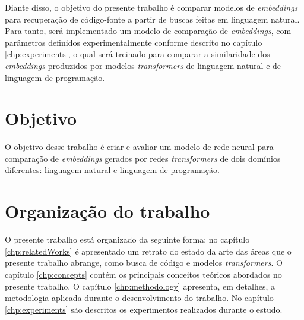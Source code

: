 Diante disso, o objetivo do presente trabalho é comparar modelos de \textit{embeddings} para recuperação de código-fonte a partir de buscas feitas em linguagem natural. Para tanto, será implementado um modelo de comparação de \textit{embeddings}, com parâmetros definidos experimentalmente conforme descrito no capítulo \ref{chp:experiments}, o qual será treinado para comparar a similaridade dos \textit{embeddings} produzidos por modelos \textit{transformers} de linguagem natural e de linguagem de programação.

\section{Objetivo}
O objetivo desse trabalho é criar e avaliar um modelo de rede neural para comparação de \textit{embeddings} gerados por redes \textit{transformers} de dois domínios diferentes: linguagem natural e linguagem de programação. 

\section{Organização do trabalho}
O presente trabalho está organizado da seguinte forma: no capítulo \ref{chp:relatedWorks} é apresentado um retrato do estado da arte das áreas que o presente trabalho abrange, como busca de código e modelos \textit{transformers}. O capítulo \ref{chp:concepts} contém os principais conceitos teóricos abordados no presente trabalho. O capítulo \ref{chp:methodology} apresenta, em detalhes, a metodologia aplicada durante o desenvolvimento do trabalho. No capítulo \ref{chp:experiments} são descritos os experimentos realizados durante o estudo.
